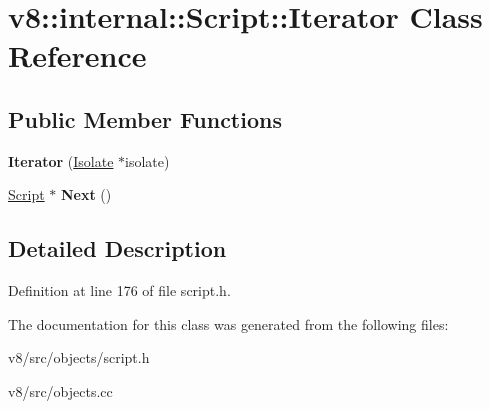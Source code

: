 \hypertarget{classv8_1_1internal_1_1Script_1_1Iterator}{}\section{v8\+:\+:internal\+:\+:Script\+:\+:Iterator Class Reference}
\label{classv8_1_1internal_1_1Script_1_1Iterator}
\subsection*{Public Member Functions}
\begin{DoxyCompactItemize}
\item 
\mbox{\label{classv8_1_1internal_1_1Script_1_1Iterator_a90c37085f529d94ebc8d8d045ffd0fed}} 
{\bfseries Iterator} (\mbox{\hyperlink{classv8_1_1internal_1_1Isolate}{Isolate}} $\ast$isolate)
\item 
\mbox{\label{classv8_1_1internal_1_1Script_1_1Iterator_a190ccddbb2dad8395191c3254b993a7b}} 
\mbox{\hyperlink{classv8_1_1internal_1_1Script}{Script}} $\ast$ {\bfseries Next} ()
\end{DoxyCompactItemize}


\subsection{Detailed Description}


Definition at line 176 of file script.\+h.



The documentation for this class was generated from the following files\+:\begin{DoxyCompactItemize}
\item 
v8/src/objects/script.\+h\item 
v8/src/objects.\+cc\end{DoxyCompactItemize}
